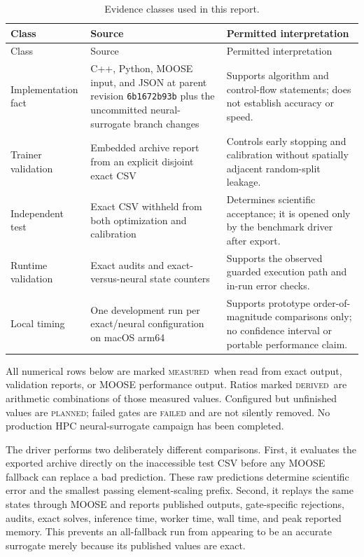 \documentclass[11pt]{article}
\newcommand{\code}[1]{\texttt{#1}}
\newcommand{\measured}{\textsc{measured}}
\newcommand{\derived}{\textsc{derived}}
\newcommand{\planned}{\textsc{planned}}
\newcommand{\failed}{\textsc{failed}}
\begin{document}
\begin{longtable}{L{0.19\textwidth}L{0.31\textwidth}L{0.42\textwidth}}
  \caption{Evidence classes used in this report.}
  \label{tab:evidence}\\
  \toprule
  Class & Source & Permitted interpretation \\
  \midrule
  \endfirsthead
  \toprule
  Class & Source & Permitted interpretation \\
  \midrule
  \endhead
  Implementation fact &
  C++, Python, MOOSE input, and JSON at parent revision \code{6b1672b93b} plus the uncommitted
  neural-surrogate branch changes &
  Supports algorithm and control-flow statements; does not establish accuracy or speed. \\
  Trainer validation &
  Embedded archive report from an explicit disjoint exact CSV &
  Controls early stopping and calibration without spatially adjacent random-split leakage. \\
  Independent test &
  Exact CSV withheld from both optimization and calibration &
  Determines scientific acceptance; it is opened only by the benchmark driver after export. \\
  Runtime validation &
  Exact audits and exact-versus-neural state counters &
  Supports the observed guarded execution path and in-run error checks. \\
  Local timing &
  One development run per exact/neural configuration on macOS arm64 &
  Supports prototype order-of-magnitude comparisons only; no confidence interval or portable
  performance claim. \\
  \bottomrule
\end{longtable}

All numerical rows below are marked \measured\ when read from exact output, validation reports, or
MOOSE performance output.  Ratios marked \derived\ are arithmetic combinations of those measured
values.  Configured but unfinished values are \planned; failed gates are \failed{} and are not
silently removed.  No production HPC neural-surrogate campaign has been completed.

The driver performs two deliberately different comparisons.  First, it evaluates the exported
archive directly on the inaccessible test CSV before any MOOSE fallback can replace a bad
prediction.  These raw predictions determine scientific error and the smallest passing
element-scaling prefix.  Second, it replays the same states through MOOSE and reports published
outputs, gate-specific rejections, audits, exact solves, inference time, worker time, wall time,
and peak reported memory.  This prevents an all-fallback run from appearing to be an accurate
surrogate merely because its published values are exact.
\end{document}
